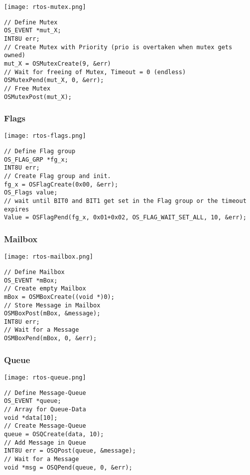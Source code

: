 \texttt{[image: rtos-mutex.png]}

\begin{lstlisting}
// Define Mutex
OS_EVENT *mut_X;
INT8U err;
// Create Mutex with Priority (prio is overtaken when mutex gets owned)
mut_X = OSMutexCreate(9, &err)
// Wait for freeing of Mutex, Timeout = 0 (endless)
OSMutexPend(mut_X, 0, &err);
// Free Mutex
OSMutexPost(mut_X);
\end{lstlisting}

\subsubsection{Flags}

\texttt{[image: rtos-flags.png]}

\begin{lstlisting}
// Define Flag group
OS_FLAG_GRP *fg_x;
INT8U err;
// Create Flag group and init.
fg_x = OSFlagCreate(0x00, &err);
OS_Flags value;
// wait until BIT0 and BIT1 get set in the Flag group or the timeout expires
Value = OSFlagPend(fg_x, 0x01+0x02, OS_FLAG_WAIT_SET_ALL, 10, &err);
\end{lstlisting}

\subsubsection{Mailbox}

\texttt{[image: rtos-mailbox.png]}

\begin{lstlisting}
// Define Mailbox
OS_EVENT *mBox;
// Create empty Mailbox
mBox = OSMBoxCreate((void *)0);
// Store Message in Mailbox
OSMBoxPost(mBox, &message);
INT8U err;
// Wait for a Message
OSMBoxPend(mBox, 0, &err);
\end{lstlisting}

\subsubsection{Queue}

\texttt{[image: rtos-queue.png]}

\begin{lstlisting}
// Define Message-Queue
OS_EVENT *queue;
// Array for Queue-Data
void *data[10];
// Create Message-Queue
queue = OSQCreate(data, 10);
// Add Message in Queue
INT8U err = OSQPost(queue, &message);
// Wait for a Message
void *msg = OSQPend(queue, 0, &err);
\end{lstlisting}

